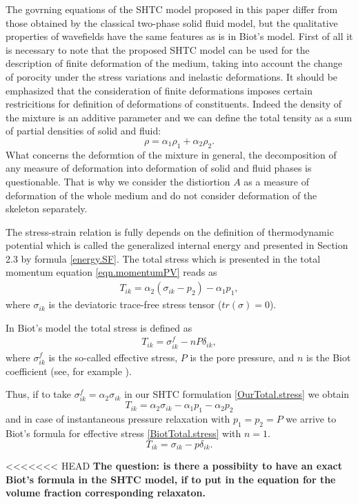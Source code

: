 \documentclass[3p,times]{elsarticle}
\begin{document}
The govrning equations of the SHTC model proposed in this paper differ from those obtained by the classical two-phase solid fluid model, but the qualitative properties of wavefields have the same features as is in Biot's model.
First of all it is necessary to note that the proposed SHTC model can be used for the description of finite deformation of the medium, taking into account the change of porocity under the stress variations and inelastic deformations. 
It should be emphasized that the consideration of finite deformations imposes certain restricitions for definition of deformations of constituents. Indeed the density of the mixture is an additive parameter and we can define the total tensity as a sum of partial  densities of solid and fluid:
$$
\rho=\alpha_1 \rho_1 + \alpha_2 \rho_2.
$$  
What concerns the deformtion of the mixture in general, the decomposition of any measure of deformation into deformation of solid and fluid phases is questionable. That is why 
we consider the distiortion $A$ as a measure of deformation of the whole medium and do not consider deformation of the skeleton separately. 

The stress-strain relation is fully depends on the definition of thermodynamic potential which is called the generalized internal energy and presented in Section 2.3 by formula \eqref{energy.SF}. The total stress which is presented in the total momentum equation \eqref{eqn.momentumPV} reads as 
\begin{align}\label{OurTotal.stress}
T_{ik}=\alpha_2 (\sigma_{ik}-p_2)-\alpha_1 p_1,
\end{align}
where $\sigma_{ik}$ is the deviatoric trace-free stress tensor ($tr (\sigma)=0$).

In Biot's model the total stress is defined as 
\begin{align}\label{BiotTotal.stress}
T_{ik}=\sigma^f_{ik}-n P\delta_{ik},
\end{align}
where $\sigma^f_{ik}$ is the so-called effective stress, $P$ is the pore pressure, and $n$ is the Biot coefficient (see, for example \cite{Merxhani2016}). 

Thus, if to take $\sigma^f_{ik}=\alpha_2\sigma_{ik}$ in our SHTC formulation \eqref{OurTotal.stress} we obtain 
$$
T_{ik}=\alpha_2 \sigma_{ik}-\alpha_1 p_1- \alpha_2 p_2
$$
and in case of instantaneous pressure relaxation with $p_1=p_2=P$ we arrive to Biot's formula for effective stress \eqref{BiotTotal.stress} with $n=1$.
$$
T_{ik}=\sigma_{ik}- p\delta_{ik}.
$$

<<<<<<< HEAD
{\Large \bf The question: is there a possibiity to have an exact Biot's formula in the SHTC model,
if to put in the equation for the volume fraction corresponding relaxaton.}   
\end{document}
